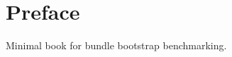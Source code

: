 \documentclass{book}
\begin{document}
\chapter{Preface}
Minimal book for bundle bootstrap benchmarking.
\end{document}
